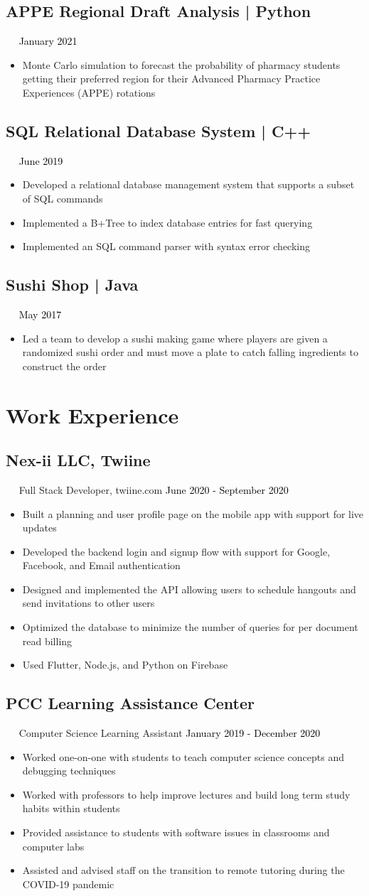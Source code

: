 \documentclass{article}
\newcommand{\resumesection}[3]{
    \subsection*{#1}
    \ 
    \ 
    \small
    \textcolor{csufgrey}{#2}
    \normalsize
    \hfill
    \textcolor{black}{#3}
    \normalsize
}
\begin{document}
\resumesection{APPE Regional Draft Analysis | Python}{}{January 2021}
\begin{itemize}
    \item Monte Carlo simulation to forecast the probability of 
        pharmacy students getting their preferred region for their Advanced Pharmacy Practice Experiences (APPE) rotations
\end{itemize}

\resumesection{SQL Relational Database System | C++}{}{June 2019}
\begin{itemize}
    \item Developed a relational database management system that supports a subset of SQL commands
    \item Implemented a B+Tree to index database entries for fast querying
    \item Implemented an SQL command parser with syntax error checking
\end{itemize}

\resumesection{Sushi Shop | Java}{}{May 2017}
\begin{itemize}
    \item Led a team to develop a sushi making game where players are given a randomized sushi order and must move a plate to catch falling ingredients to construct the order
\end{itemize}
\hfill
\section*{Work Experience}
\resumesection{Nex-ii LLC, Twiine}{Full Stack Developer, twiine.com}{June 2020 - September 2020}
\begin{itemize}
    \item Built a planning and user profile page on the mobile app with support for live updates
    \item Developed the backend login and signup flow with support for Google, Facebook, and Email authentication
    \item Designed and implemented the API allowing users to schedule hangouts and send invitations to other users
    \item Optimized the database to minimize the number of queries for per document read billing
    \item Used Flutter, Node.js, and Python on Firebase
\end{itemize}
\resumesection{PCC Learning Assistance Center}{Computer Science Learning Assistant}{January 2019 - December 2020}
\begin{itemize}
    \item Worked one-on-one with students to teach computer science concepts and debugging techniques
    \item Worked with professors to help improve lectures and build long term study habits within students
    \item Provided assistance to students with software issues in classrooms and computer labs
    \item Assisted and advised staff on the transition to remote tutoring during the COVID-19 pandemic
\end{itemize}
\hfill
\end{document}
